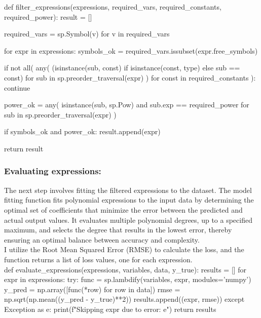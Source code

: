 \documentclass{article}
\begin{document}
def filter_expressions(expressions, required_vars, required_constants, required_power):
    result = []

    required_vars = {sp.Symbol(v) for v in required_vars}

    for expr in expressions:
        symbols_ok = required_vars.issubset(expr.free_symbols)

        if not all(
            any(
                (isinstance(sub, const) if isinstance(const, type)
                 else sub == const)
                for sub in sp.preorder_traversal(expr)
            )
            for const in required_constants
        ):
            continue


        power_ok = any(
            isinstance(sub, sp.Pow) and sub.exp == required_power
            for sub in sp.preorder_traversal(expr)
        )

        if symbols_ok and power_ok:
            result.append(expr)

    return result



\subsubsection{Evaluating expressions:}

The next step involves fitting the filtered expressions to the dataset. The model fitting function fits polynomial expressions to the input data by determining the optimal set of coefficients that minimize the error between the predicted and actual output values. It evaluates multiple polynomial degrees, up to a specified maximum, and selects the degree that results in the lowest error, thereby ensuring an optimal balance between accuracy and complexity.\\

I utilize the Root Mean Squared Error (RMSE) to calculate the loss, and the function returns a list of loss values, one for each expression.\\

def evaluate_expressions(expressions, variables, data, y_true):
    results = []
    for expr in expressions:
        try:
            func = sp.lambdify(variables, expr, modules='numpy')
            y_pred = np.array([func(*row) for row in data])
            rmse = np.sqrt(np.mean((y_pred - y_true)**2))
            results.append((expr, rmse))
        except Exception as e:
            print(f"Skipping {expr} due to error: {e}")
    return results
\end{document}
